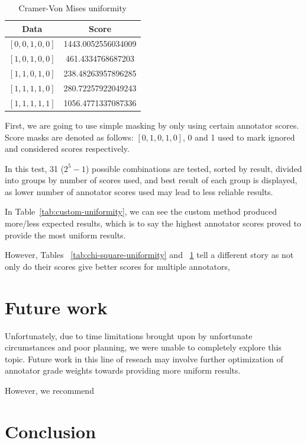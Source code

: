 \documentclass[10pt, a4paper]{article}
\begin{document}
\begin{table}[ht]
\centering
\caption{Cramer-Von Mises uniformity}
\begin{tabular}{|c|c|}
\hline
Data & Score \\
\hline
$[0, 0, 1, 0, 0]$ & 1443.0052556034009 \\
$[1, 0, 1, 0, 0]$ & 461.4334768687203 \\
$[1, 1, 0, 1, 0]$ & 238.48263957896285 \\
$[1, 1, 1, 1, 0]$ & 280.72257922049243 \\
$[1, 1, 1, 1, 1]$ & 1056.4771337087336 \\
\hline
\end{tabular}
\label{tab:cramer-von-mises-uniformity}
\end{table}

First, we are going to use simple masking by only using certain annotator scores. Score masks are denoted as follows:
$[0,1,0,1,0]$, 0 and 1 used to mark ignored and considered scores respectively.

In this test, 31 ($2^5 -1 $) possible combinations are tested, sorted by result, divided into groups by number of scores used, and best result of each group is displayed, as lower number of annotator scores used may lead to less reliable results.

In Table~\ref{tab:custom-uniformity}, we can see the custom method produced more/less expected  results, which is to say the highest annotator scores proved to provide the most uniform results.

However, Tables ~\ref{tab:chi-square-uniformity} and ~\ref{tab:cramer-von-mises-uniformity} tell a different story as not only do their scores give better scores for multiple annotators, 
\section{Future work}
Unfortunately, due to time limitations brought upon by unfortunate circumstances and poor planning, we were unable to completely explore this topic. Future work in this line of reseach may involve further optimization of annotator grade weights towards providing more uniform results.

However, we recommend 

\section{Conclusion}
\end{document}
